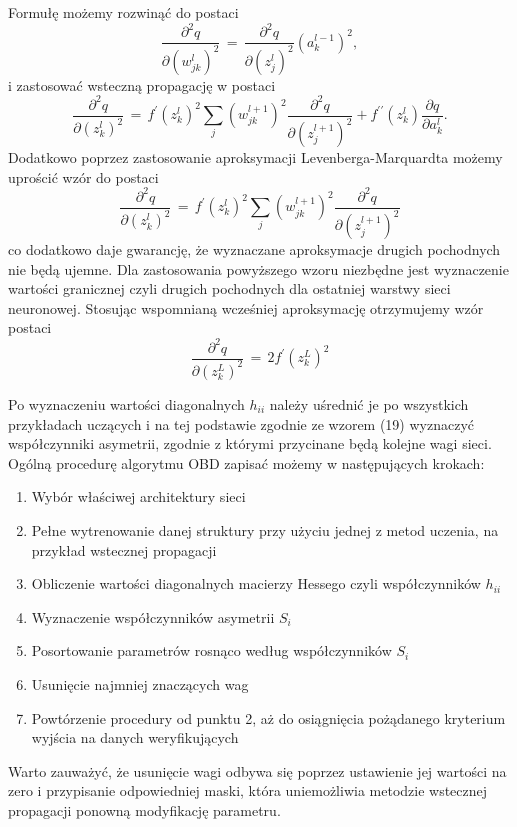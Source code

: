 Formułę możemy rozwinąć do postaci 
\begin{equation}
\frac{\partial^2 q}{\partial (w_{jk}^l)^2} \, = \, \frac{\partial^2 q}{\partial (z_j^{l})^2}(a_k^{l-1})^2 , 
\end{equation}
i zastosować wsteczną propagację w postaci
\begin{equation}
\frac{\partial^2q}{\partial (z_k^{l})^2} \, = \, f^{\prime}(z_k^l)^2 \sum_j (w_{jk}^{l+1})^2 \frac{\partial^2 q}{\partial (z_j^{l+1})^2} + f^{\prime \prime}(z_k^l) \frac{\partial q}{\partial a_k^l}. 
\end{equation}
Dodatkowo poprzez zastosowanie aproksymacji Levenberga-Marquardta możemy uprościć wzór do postaci
\begin{equation}
\frac{\partial^2q}{\partial (z_k^{l})^2} \, = \, f^{\prime}(z_k^l)^2 \sum_j (w_{jk}^{l+1})^2 \frac{\partial^2 q}{\partial (z_j^{l+1})^2}
\end{equation}
co dodatkowo daje gwarancję, że wyznaczane aproksymacje drugich pochodnych nie będą ujemne.
Dla zastosowania powyższego wzoru niezbędne jest wyznaczenie wartości granicznej czyli drugich pochodnych dla ostatniej warstwy sieci neuronowej. Stosując wspomnianą wcześniej aproksymację otrzymujemy wzór postaci
\begin{equation}
\frac{\partial^2q}{\partial (z_k^{L})^2} \, = \, 2f^{\prime}(z_k^{L})^2
\end{equation}
\par Po wyznaczeniu wartości diagonalnych \( h_{ii} \) należy uśrednić je po wszystkich przykładach uczących i na tej podstawie zgodnie ze wzorem (19) wyznaczyć współczynniki asymetrii, zgodnie z którymi przycinane będą kolejne wagi sieci. Ogólną procedurę algorytmu OBD zapisać możemy w następujących krokach: 
\begin{enumerate}
 \item Wybór właściwej architektury sieci
 \item Pełne wytrenowanie danej struktury przy użyciu jednej z metod uczenia, na przykład wstecznej propagacji
 \item Obliczenie wartości diagonalnych macierzy Hessego czyli współczynników \( h_{ii} \) 
 \item Wyznaczenie współczynników asymetrii \( S_i \)
 \item Posortowanie parametrów rosnąco według współczynników \( S_i \)
 \item Usunięcie najmniej znaczących wag
 \item Powtórzenie procedury od punktu 2, aż do osiągnięcia pożądanego kryterium wyjścia  na danych weryfikujących
\end{enumerate}
Warto zauważyć, że usunięcie wagi odbywa się poprzez ustawienie jej wartości na zero i przypisanie odpowiedniej maski, która uniemożliwia metodzie wstecznej propagacji ponowną modyfikację parametru.  

